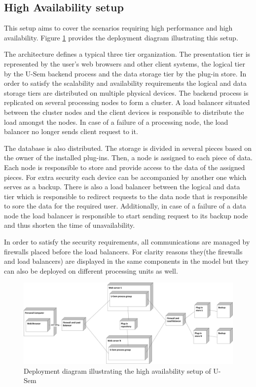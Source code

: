 \subsection{High Availability setup} 

This setup aims to cover the scenarios requiring high performance and high availability. Figure \ref{high_avail} provides the deployment diagram illustrating this setup.

The architecture defines a typical three tier organization. The presentation tier is represented by the user's web browsers and other client systems, the logical tier by the U-Sem backend process and the data storage tier by the plug-in store. In order to satisfy the scalability and availability requirements the logical and data storage tiers are distributed on multiple physical
devices. The backend process is replicated on several processing nodes to form a cluster. A load balancer situated between the cluster nodes and the client devices is responsible to distribute the load amongst the nodes. In case of a failure of a processing node, the load balancer no longer sends client request to it.

The database is also distributed. The storage is divided in several pieces based on the owner of the installed plug-ins. Then, a node is assigned to each piece of data. Each node is responsible to store and provide access to the data of the assigned pieces. For extra security each device can be accompanied by another one which serves as a backup. There is also a load balancer between the logical and data tier which is responsible to redirect requests to the data node that is responsible to sore the data for the required user. Additionally, in case of a failure of a data node the load balancer is responsible to start sending request to its backup node and thus shorten the time of unavailability.

In order to satisfy the security requirements, all communications are managed by firewalls placed before the load balancers. For clarity reasons they(the firewalls and load balancers) are displayed in the same components in the model but they can also be deployed on different processing units as well.


\begin{figure}[h!]
  \centering
  	\includegraphics[scale=0.70]{plug-in/layers/high_setup.png}
  \caption{Deployment diagram illustrating the high availability setup of U-Sem}
  \label{high_avail}
\end{figure}

